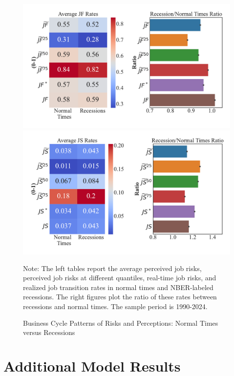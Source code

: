 \begin{figure}[pt] 
\centering 
	\caption{Business Cycle Patterns of Risks and Perceptions: Normal Times versus Recessions} 
	\label{fig:bus_cycle_stats_av}
\includegraphics[width=0.8\linewidth]{Figures/business_cycle_JF_stats.pdf} \\
\includegraphics[width=0.8\linewidth]{Figures/business_cycle_JS_stats.pdf} \\
 	
    	\begin{flushleft}\footnotesize {Note: The left tables report the average perceived job risks, perceived job risks at different quantiles, real-time job risks, and realized job transition rates in normal times and NBER-labeled recessions. The right figures plot the ratio of these rates between recessions and normal times. The sample period is 1990-2024.} \end{flushleft}
\end{figure}



\section{Additional Model Results}
\label{appendix:model_results}




